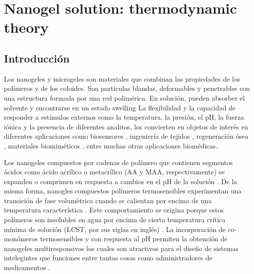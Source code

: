 \chapter{Nanogel solution: thermodynamic theory} \label{cap:mc:soluciones}
	
	\section{Introducci\'on}
	
	Los nanogeles y microgeles son materiales que combinan las propiedades de los pol\'imeros y de los coloides. Son part\'iculas blandas, deformables y penetrables con una estructura formada por una red polim\'erica. En soluci\'on, pueden absorber el solvente y encontrarse en un estado swelling \cite{karg2019nanogels,perez2021thermodynamic,lyon2012polymer}
	La flexibilidad y la capacidad de responder a est\'imulos externos como la temperatura, la presi\'on, el pH, la fuerza i\'onica y la presencia de diferentes analitos, los convierten en objetos de inter\'es en diferentes aplicaciones como biosensores \cite{zhang2012ultrathin,islam2014responsive}, ingenier\'ia de tejidos \cite{matricardi2013interpenetrating,van2011biopolymer}, regeneraci\'on \'osea \cite{bai2018bioactive}, materiales biomim\'eticos \cite{green2016mimicking,wu2010multifunctional}, entre muchas otras aplicaciones biom\'edicas.\cite{Daly2020}. 
	
	Los nanogeles compuestos por cadenas de pol\'imero que contienen segmentos \'acidos como \'acido acr\'ilico o metacr\'ilico (AA y MAA, respectivamente) se expanden o comprimen  en respuesta a cambios en el pH de la soluci\'on \cite{snowden1996colloidal,Zhou1998}.
	De la misma forma, nanogles compuestos pol\'imeros termosensibles experimentan una transici\'on de fase volum\'etrica cuando se calientan por encima de una temperatura caracter\'istica \cite{Pelton1986,Pelton2000}.
	Este comportamiento se origina porque estos pol\'imeros son insolubles en agua por encima de cierta temperatura cr\'itica m\'inima  de soluci\'on (LCST, por sus siglas en ingl\'es) \cite{Kawaguchi2020}.
	La incorporaci\'on de co-mon\'omeros termosensibles y con respuesta al pH permiten la obtenci\'on de nanogeles multiresponsivos los cuales son atractivos para el dise\~no de sistemas intelegintes que funciones entre tantas cosas como administradores de medicamentos \cite{Liu2017}.
	
